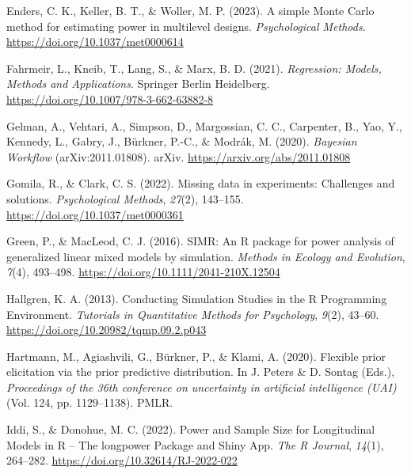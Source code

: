 \documentclass[
  man,
  floatsintext,
  longtable,
  a4paper,
  nolmodern,
  notxfonts,
  notimes,
  colorlinks=true,linkcolor=blue,citecolor=blue,urlcolor=blue]{apa7}
\newlength{\cslhangindent}
\newenvironment{CSLReferences}[2] %
 {\begin{list}{}{%
  \setlength{\itemindent}{0pt}
  \setlength{\leftmargin}{0pt}
  \setlength{\parsep}{0pt}
  \ifodd #1
   \setlength{\leftmargin}{\cslhangindent}
   \setlength{\itemindent}{-1\cslhangindent}
  \fi
  \setlength{\itemsep}{#2\baselineskip}}}
 {\end{list}}
\begin{document}
\begin{CSLReferences}{1}{0}
Enders, C. K., Keller, B. T., \& Woller, M. P. (2023). A simple {Monte
Carlo} method for estimating power in multilevel designs.
\emph{Psychological Methods}. \url{https://doi.org/10.1037/met0000614}

Fahrmeir, L., Kneib, T., Lang, S., \& Marx, B. D. (2021).
\emph{Regression: {Models}, {Methods} and {Applications}}. Springer
Berlin Heidelberg. \url{https://doi.org/10.1007/978-3-662-63882-8}

Gelman, A., Vehtari, A., Simpson, D., Margossian, C. C., Carpenter, B.,
Yao, Y., Kennedy, L., Gabry, J., Bürkner, P.-C., \& Modrák, M. (2020).
\emph{Bayesian {Workflow}} (arXiv:2011.01808). arXiv.
\url{https://arxiv.org/abs/2011.01808}

Gomila, R., \& Clark, C. S. (2022). Missing data in experiments:
{Challenges} and solutions. \emph{Psychological Methods}, \emph{27}(2),
143--155. \url{https://doi.org/10.1037/met0000361}

Green, P., \& MacLeod, C. J. (2016). {SIMR}: An {R} package for power
analysis of generalized linear mixed models by simulation. \emph{Methods
in Ecology and Evolution}, \emph{7}(4), 493--498.
\url{https://doi.org/10.1111/2041-210X.12504}

Hallgren, K. A. (2013). Conducting {Simulation Studies} in the {R
Programming Environment}. \emph{Tutorials in Quantitative Methods for
Psychology}, \emph{9}(2), 43--60.
\url{https://doi.org/10.20982/tqmp.09.2.p043}

Hartmann, M., Agiashvili, G., Bürkner, P., \& Klami, A. (2020). Flexible
prior elicitation via the prior predictive distribution. In J. Peters \&
D. Sontag (Eds.), \emph{Proceedings of the 36th conference on
uncertainty in artificial intelligence ({UAI})} (Vol. 124, pp.
1129--1138). PMLR.

Iddi, S., \& Donohue, M. C. (2022). Power and {Sample Size} for
{Longitudinal Models} in {R} -- {The} longpower {Package} and {Shiny
App}. \emph{The R Journal}, \emph{14}(1), 264--282.
\url{https://doi.org/10.32614/RJ-2022-022}


\end{CSLReferences}
\end{document}

